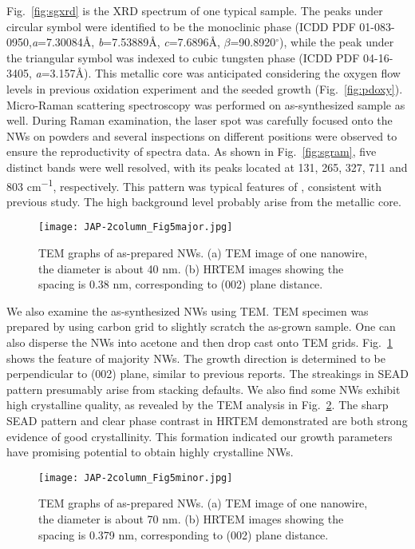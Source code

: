 Fig.~\ref{fig:sgxrd} is the XRD spectrum of one typical sample. The peaks under circular symbol were identified to be the monoclinic  phase (ICDD PDF 01-083-0950,\emph{a}=7.30084\AA, \emph{b}=7.53889\AA, \emph{c}=7.6896\AA, $\beta$=90.8920$^\circ$), while the peak under the triangular symbol was indexed to cubic tungsten phase (ICDD PDF 04-16-3405, \emph{a}=3.157\AA). This metallic core was anticipated considering the oxygen flow levels in previous oxidation experiment and the seeded growth (Fig.~\ref{fig:pdoxy}). Micro-Raman scattering spectroscopy was performed on as-synthesized sample as well. During Raman examination, the laser spot was carefully focused onto the NWs on powders and several inspections on different positions were observed to ensure the reproductivity of spectra data. As shown in Fig.~\ref{fig:sgram}, five distinct bands were well resolved, with its peaks located at 131, 265, 327, 711 and 803 \si{cm^{-1}}, respectively. This pattern was typical features of , consistent with previous study.\cite{Salje1975a,Dixit1986} The high background level probably arise from the metallic core.
\begin{figure}[htb]
\centering
\texttt{[image: JAP-2column\_Fig5major.jpg]}
\caption[Characterization of : TEM]{TEM graphs of as-prepared NWs. (a) TEM image of one nanowire, the diameter is about 40 nm. (b) HRTEM images showing the spacing is 0.38 nm, corresponding to (002) plane distance.}
\label{fig:woseedtem1}
\end{figure}

We also examine the as-synthesized NWs using TEM. TEM specimen was prepared by using carbon grid to slightly scratch the as-grown sample. One can also disperse the NWs into acetone and then drop cast onto TEM grids. Fig.~\ref{fig:woseedtem1} shows the feature of majority NWs. The growth direction is determined to be perpendicular to (002) plane, similar to previous reports. The streakings in SEAD pattern presumably arise from stacking defaults. We also find some NWs exhibit high crystalline quality, as revealed by the TEM analysis in Fig.~\ref{fig:woseedtem2}. The sharp SEAD pattern and clear phase contrast in HRTEM demonstrated are both strong evidence of good crystallinity. This formation indicated our growth parameters have promising potential to obtain highly crystalline  NWs.

\begin{figure}[htb]
\centering
\texttt{[image: JAP-2column\_Fig5minor.jpg]}
\caption[Characterization of : TEM cont]{TEM graphs of as-prepared NWs. (a) TEM image of one nanowire, the diameter is about 70 nm. (b) HRTEM images showing the spacing is 0.379 nm, corresponding to (002) plane distance.}
\label{fig:woseedtem2}
\end{figure}

